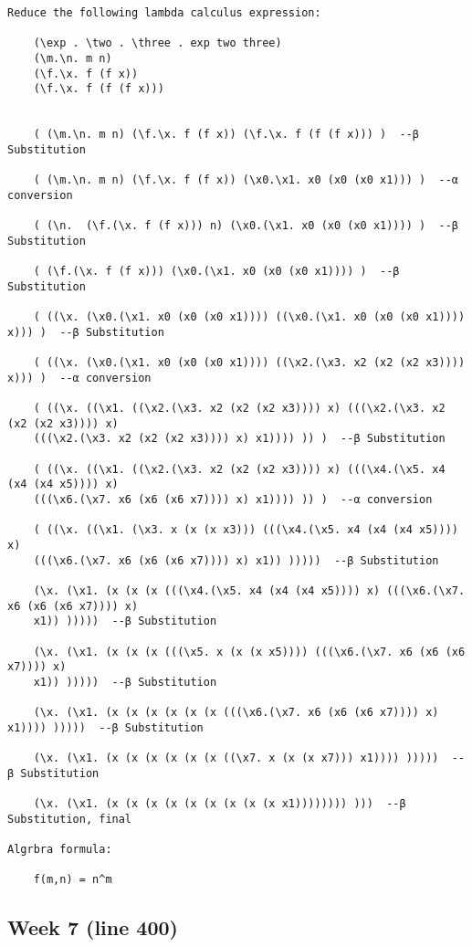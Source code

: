 \documentclass{article}
\theoremstyle{theorem}
\theoremstyle{definition}
\theoremstyle{remark}
\begin{document}
\begin{verbatim}
Reduce the following lambda calculus expression:

    (\exp . \two . \three . exp two three)
    (\m.\n. m n)
    (\f.\x. f (f x))
    (\f.\x. f (f (f x)))

 
    ( (\m.\n. m n) (\f.\x. f (f x)) (\f.\x. f (f (f x))) )  --β Substitution

    ( (\m.\n. m n) (\f.\x. f (f x)) (\x0.\x1. x0 (x0 (x0 x1))) )  --α conversion

    ( (\n.  (\f.(\x. f (f x))) n) (\x0.(\x1. x0 (x0 (x0 x1)))) )  --β Substitution

    ( (\f.(\x. f (f x))) (\x0.(\x1. x0 (x0 (x0 x1)))) )  --β Substitution

    ( ((\x. (\x0.(\x1. x0 (x0 (x0 x1)))) ((\x0.(\x1. x0 (x0 (x0 x1)))) x))) )  --β Substitution

    ( ((\x. (\x0.(\x1. x0 (x0 (x0 x1)))) ((\x2.(\x3. x2 (x2 (x2 x3)))) x))) )  --α conversion

    ( ((\x. ((\x1. ((\x2.(\x3. x2 (x2 (x2 x3)))) x) (((\x2.(\x3. x2 (x2 (x2 x3)))) x) 
    (((\x2.(\x3. x2 (x2 (x2 x3)))) x) x1)))) )) )  --β Substitution

    ( ((\x. ((\x1. ((\x2.(\x3. x2 (x2 (x2 x3)))) x) (((\x4.(\x5. x4 (x4 (x4 x5)))) x) 
    (((\x6.(\x7. x6 (x6 (x6 x7)))) x) x1)))) )) )  --α conversion

    ( ((\x. ((\x1. (\x3. x (x (x x3))) (((\x4.(\x5. x4 (x4 (x4 x5)))) x) 
    (((\x6.(\x7. x6 (x6 (x6 x7)))) x) x1)) )))))  --β Substitution

    (\x. (\x1. (x (x (x (((\x4.(\x5. x4 (x4 (x4 x5)))) x) (((\x6.(\x7. x6 (x6 (x6 x7)))) x) 
    x1)) )))))  --β Substitution

    (\x. (\x1. (x (x (x (((\x5. x (x (x x5)))) (((\x6.(\x7. x6 (x6 (x6 x7)))) x) 
    x1)) )))))  --β Substitution

    (\x. (\x1. (x (x (x (x (x (x (((\x6.(\x7. x6 (x6 (x6 x7)))) x) x1)))) )))))  --β Substitution

    (\x. (\x1. (x (x (x (x (x (x ((\x7. x (x (x x7))) x1)))) )))))  --β Substitution

    (\x. (\x1. (x (x (x (x (x (x (x (x (x x1)))))))) )))  --β Substitution, final

Algrbra formula:

    f(m,n) = n^m
\end{verbatim}

\subsection{Week 7 (line 400)}
\end{document}

